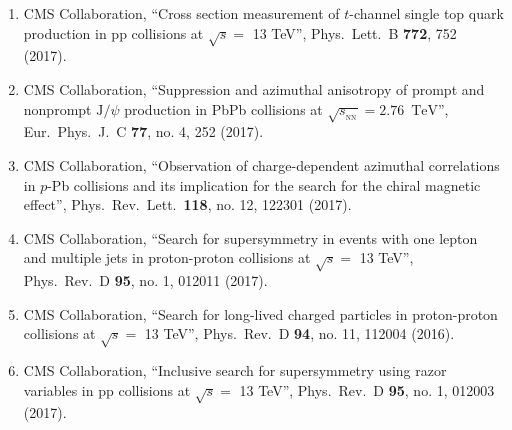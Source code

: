 \begin{itemize}
\begin{enumerate}
\item CMS Collaboration, ``Cross section measurement of $t$-channel single top quark production in pp collisions at $\sqrt s =$ 13 TeV'', Phys.\ Lett.\ B {\bf 772}, 752 (2017).

\item CMS Collaboration, ``Suppression and azimuthal anisotropy of prompt and nonprompt ${\mathrm{J}}/\psi $ production in PbPb collisions at $\sqrt{{s_{_{\text {NN}}}}} =2.76$ $\,\mathrm{TeV}$'', Eur.\ Phys.\ J.\ C {\bf 77}, no. 4, 252 (2017).

\item CMS Collaboration, ``Observation of charge-dependent azimuthal correlations in $p$-Pb collisions and its implication for the search for the chiral magnetic effect'', Phys.\ Rev.\ Lett.\  {\bf 118}, no. 12, 122301 (2017).

\item CMS Collaboration, ``Search for supersymmetry in events with one lepton and multiple jets in proton-proton collisions at $\sqrt{s} =$ 13 TeV'', Phys.\ Rev.\ D {\bf 95}, no. 1, 012011 (2017).

\item CMS Collaboration, ``Search for long-lived charged particles in proton-proton collisions at $\sqrt{s}=$ 13 TeV'', Phys.\ Rev.\ D {\bf 94}, no. 11, 112004 (2016).

\item CMS Collaboration, ``Inclusive search for supersymmetry using razor variables in pp collisions at $\sqrt{s}=$ 13 TeV'', Phys.\ Rev.\ D {\bf 95}, no. 1, 012003 (2017).


\end{enumerate}
\end{itemize}
